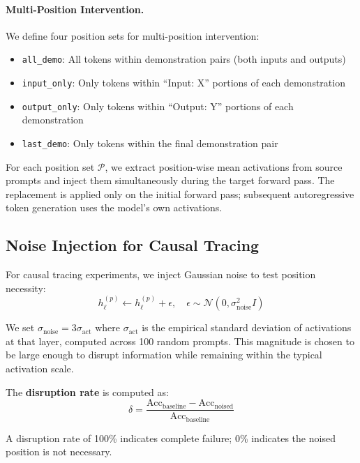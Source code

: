 \documentclass[11pt]{article}
\begin{document}
\paragraph{Multi-Position Intervention.} We define four position sets for multi-position intervention:
\begin{itemize}
    \item \texttt{all\_demo}: All tokens within demonstration pairs (both inputs and outputs)
    \item \texttt{input\_only}: Only tokens within ``Input: X'' portions of each demonstration
    \item \texttt{output\_only}: Only tokens within ``Output: Y'' portions of each demonstration
    \item \texttt{last\_demo}: Only tokens within the final demonstration pair
\end{itemize}

For each position set $\mathcal{P}$, we extract position-wise mean activations from source prompts and inject them simultaneously during the target forward pass. The replacement is applied only on the initial forward pass; subsequent autoregressive token generation uses the model's own activations.

\subsection{Noise Injection for Causal Tracing}

For causal tracing experiments, we inject Gaussian noise to test position necessity:
\begin{equation}
    h_\ell^{(p)} \leftarrow h_\ell^{(p)} + \epsilon, \quad \epsilon \sim \mathcal{N}(0, \sigma_\text{noise}^2 I)
\end{equation}

We set $\sigma_\text{noise} = 3\sigma_\text{act}$ where $\sigma_\text{act}$ is the empirical standard deviation of activations at that layer, computed across 100 random prompts. This magnitude is chosen to be large enough to disrupt information while remaining within the typical activation scale.

The \textbf{disruption rate} is computed as:
\begin{equation}
    \delta = \frac{\text{Acc}_\text{baseline} - \text{Acc}_\text{noised}}{\text{Acc}_\text{baseline}}
\end{equation}

A disruption rate of 100\% indicates complete failure; 0\% indicates the noised position is not necessary.
\end{document}
